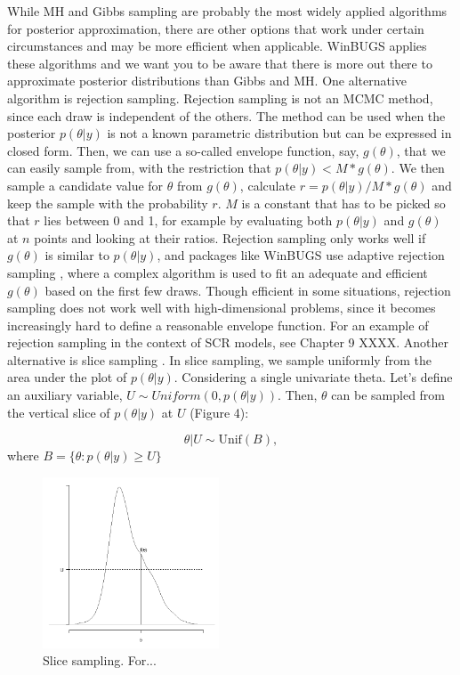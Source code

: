 While MH and Gibbs sampling are probably the most widely applied algorithms for posterior approximation, there are other options that work under certain circumstances and may be more efficient when applicable. WinBUGS applies these algorithms and we want you to be aware that there is more out there to approximate posterior distributions than Gibbs and MH.
One alternative algorithm is rejection sampling. Rejection sampling is not an MCMC method, since each draw is independent of the others. The method can be used when the posterior $p(\theta|y)$ is not a known parametric distribution but can be expressed in closed form. Then, we can use a so-called envelope function, say, $g(\theta)$, that we can easily sample from, with the restriction that $p(\theta|y) < M * g(\theta)$. We then sample a candidate value for $\theta$ from $g(\theta)$, calculate $r = p(\theta|y)/M*g(\theta)$ and keep the sample with the probability $r$. $M$ is a constant that has to be picked so that $r$ lies between 0 and 1, for example by evaluating both $p(\theta|y)$ and $g(\theta)$ at $n$ points and looking at their ratios. Rejection sampling only works well if $g(\theta)$ is similar to $p(\theta|y)$, and packages like WinBUGS use adaptive rejection sampling \citep{gilks_wild:1992}, where a complex algorithm is used to fit an adequate and efficient $g(\theta)$ based on the first few draws. Though efficient in some situations, rejection sampling does not work well with high-dimensional problems, since it becomes increasingly hard to define a reasonable envelope function. For an example of rejection sampling in the context of SCR models, see Chapter 9 XXXX.
Another alternative is slice sampling \citep{neal:2003}. In slice sampling, we sample uniformly from the area under the plot of $p(\theta|y)$. Considering a single univariate theta. Let's define an auxiliary variable, $U \sim  Uniform(0, p(\theta|y))$. Then, $\theta$ can be sampled from the vertical slice of $p(\theta|y)$ at $U$ (Figure 4):

\[
\theta|U \sim \mbox{Unif}(B),
\]
where $B = \{\theta: p(\theta|y) \geq U\}$

\begin{figure}
\begin{center}
\includegraphics[height=2in]{Ch7/figs/slicesampling}
\end{center}
\caption{Slice sampling. For...}
\label{slicesample.fig}
\end{figure}

